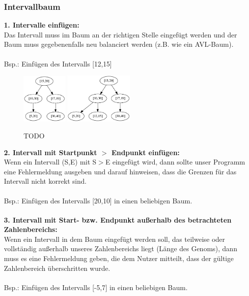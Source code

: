 \subsubsection{Intervallbaum}
\textbf{1. Intervalle einfügen:}\\
Das Intervall muss im Baum an der richtigen Stelle eingefügt werden und der Baum muss gegebenenfalls neu balanciert werden (z.B. wie ein AVL-Baum).\\\\
Bsp.: Einfügen des Intervalls [12,15]
\begin{figure}[H]
 \centering
	\includegraphics[width=0.2\textwidth]{middleware/Testfaelle/1.png}
	\includegraphics[width=0.3\textwidth]{middleware/Testfaelle/2.png}
 \caption{TODO}
 \label{fig:TODO}
\end{figure}
\textbf{2. Intervall mit Startpunkt $>$ Endpunkt einfügen:}\\
Wenn ein Intervall (S,E) mit S$>$E eingefügt wird, dann sollte unser Programm eine Fehlermeldung ausgeben und darauf hinweisen, dass die Grenzen für das Intervall nicht korrekt sind.\\\\
Bsp.: Einfügen des Intervalls [20,10] in einen beliebigen Baum.\\\\
\textbf{3. Intervall mit Start- bzw. Endpunkt außerhalb des betrachteten Zahlenbereichs:}\\
Wenn ein Intervall in dem Baum eingefügt werden soll, das teilweise oder vollständig außerhalb unseres Zahlenbereichs liegt (Länge des Genoms), dann muss es eine Fehlermeldung geben, die dem Nutzer mitteilt, dass der gültige Zahlenbereich überschritten wurde.\\\\
Bsp.: Einfügen des Intervalls [-5,7] in einen beliebigen Baum.\newpage\hfill\\
